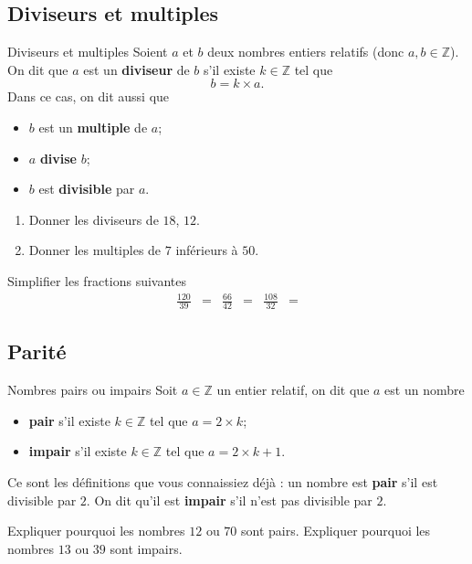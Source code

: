 \documentclass[11pt]{article}
\begin{document}
\subsection{Diviseurs et multiples}
\begin{defi}{Diviseurs et multiples}
  Soient $a$ et $b$ deux nombres entiers relatifs (donc $a,b\in\mathbb{Z}$). On
  dit que $a$ est un \textbf{diviseur} de $b$ s'il existe $k\in\mathbb{Z}$ tel
  que
  \[
    b = k\times a.
  \]
  Dans ce cas, on dit aussi que
  \begin{itemize}
    \item $b$ est un \textbf{multiple} de $a$;
    \item $a$ \textbf{divise} $b$;
    \item $b$ est \textbf{divisible} par $a$.
  \end{itemize}
\end{defi}
\begin{app}
  \begin{enumerate}
    \item Donner les diviseurs de $18$, $12$.
    \item Donner les multiples de $7$ inférieurs à $50$.
  \end{enumerate}
\end{app}
\begin{app}
  Simplifier les fractions suivantes
  \begin{align*}
    \frac{120}{39} &= &
    \frac{66}{42} &= &
    \frac{108}{32} &=
  \end{align*}
\end{app}
\subsection{Parité}
\begin{defi}{Nombres pairs ou impairs}
  Soit $a\in\mathbb{Z}$ un entier relatif, on dit que $a$ est un nombre
  \begin{itemize}
    \item \textbf{pair} s'il existe $k\in\mathbb{Z}$ tel que $a=2\times k$;
    \item \textbf{impair} s'il existe $k\in\mathbb{Z}$ tel que $a=2\times k+1$.
  \end{itemize}
\end{defi}
\begin{rmq}
  Ce sont les définitions que vous connaissiez déjà : un nombre est
  \textbf{pair} s'il est divisible par $2$. On dit qu'il est \textbf{impair} s'il
  n'est pas divisible par $2$.
\end{rmq}
\begin{app}
  Expliquer pourquoi les nombres $12$ ou $70$ sont pairs. Expliquer pourquoi les
  nombres $13$ ou $39$ sont impairs.
\end{app}
\end{document}
